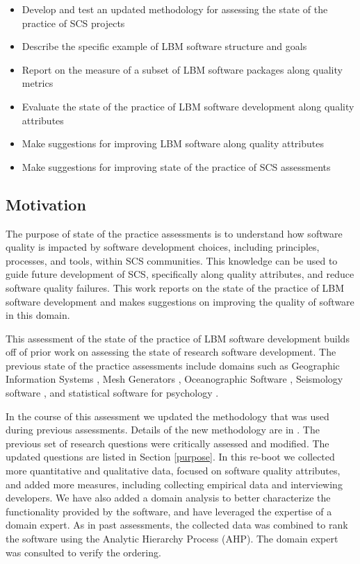 \documentclass[12pt, notitlepage]{article}
\begin{document}
\begin{itemize}
	\item Develop and test an updated methodology for assessing the state of the practice of SCS projects
	\item Describe the specific example of LBM software structure and goals
	\item Report on the measure of a subset of LBM software packages along quality metrics
	\item Evaluate the state of the practice of LBM software development along quality attributes
	\item Make suggestions for improving LBM software along quality attributes
	\item Make suggestions for improving state of the practice of SCS assessments
\end{itemize}

\subsection{Motivation}

The purpose of state of the practice assessments is to understand how software quality is impacted by software development choices, including principles, processes, and tools, within SCS communities. This knowledge can be used to guide future development of SCS, specifically along quality attributes, and reduce software quality failures. This work reports on the state of the practice of LBM software development and makes suggestions on improving the quality of software in this domain.

This assessment of the state of the practice of LBM software development builds off of prior work on assessing the state of research software development. The previous state of the practice assessments include domains such as Geographic Information Systems \citep{SmithEtAl2018_arXivGIS}, Mesh Generators \citep{SmithEtAl2016}, Oceanographic Software \citep{smith2015state}, Seismology software \citep{SmithEtAl2018}, and statistical software for psychology \citep{SmithEtAl2018_StatSoft}. 

In the course of this assessment we updated the methodology that was used during previous assessments. Details of the new methodology are in \citep{methodology2020}. The previous set of research questions were critically assessed and modified. The updated questions are listed in Section \ref{purpose}. In this re-boot we collected more quantitative and qualitative data, focused on software quality attributes, and added more measures, including collecting empirical data and interviewing developers. We have also added a domain analysis to better characterize the functionality provided by the software, and have leveraged the expertise of a domain expert. As in past assessments, the collected data was combined to rank the software using the Analytic Hierarchy Process (AHP). The domain expert was consulted to verify the ordering.
\end{document}

